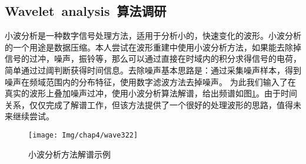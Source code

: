 \subsection{Wavelet~analysis~算法调研}
小波分析是一种数字信号处理方法\citep{torrence1998practical}，适用于分析小的，快速变化的波形。小波分析的一个用途是数据压缩。本人尝试在波形重建中使用小波分析方法，如果能去除掉信号的过冲，噪声，振铃等，那么可以通过直接在时域内的积分求得信号的电荷，简单通过过阈判断获得时间信息。去除噪声基本思路是：通过采集噪声样本，得到噪声在频域范围内的分布特征，使用数字滤波方法去掉噪声。
为此我们输入了在真实的波形上叠加噪声过冲，使用小波分析算法解谱，给出频谱如图\ref{fig:wave3}。由于时间关系，仅仅完成了解谱工作，但该方法提供了一个很好的处理波形的思路，值得未来继续尝试。
\begin{figure}[!htbp]
  \centering
   \texttt{[image: Img/chap4/wave322]}
    \caption{小波分析方法解谱示例}
  \label{fig:wave3}
\end{figure}

